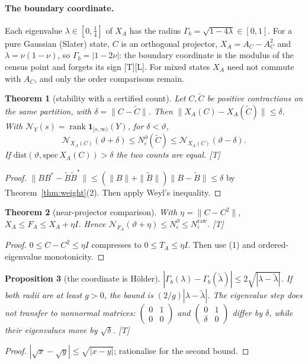 \documentclass[11pt]{article}
\newtheorem{theorem}{Theorem}[section]
\newtheorem{proposition}[theorem]{Proposition}
\theoremstyle{definition}
\newcommand{\grade}[1]{\textsf{\small[#1]}}
\newcommand{\rank}{\operatorname{rank}}
\begin{document}
\paragraph{The boundary coordinate.} Each eigenvalue $\lambda\in[0,\tfrac14]$ of $X_A$ has the radius $\Gamma_b=\sqrt{1-4\lambda}\in[0,1]$. For a pure Gaussian (Slater) state, $C$ is an orthogonal projector, $X_A=A_C-A_C^2$ and $\lambda=\nu(1-\nu)$, so $\Gamma_b=|1-2\nu|$: the boundary coordinate is the modulus of the census point and forgets its sign \grade{T}\grade{L}. For mixed states $X_A$ need not commute with $A_C$, and only the order comparisons remain.

\begin{theorem}[stability with a certified count]\label{thm:stab}
Let $C,\tilde C$ be positive contractions on the same partition, with $\delta=\|C-\tilde C\|$. Then $\|X_A(C)-X_A(\tilde C)\|\le\delta$. With $\mathcal N_Y(s)=\rank\mathbf 1_{[s,\infty)}(Y)$, for $\delta<\vartheta$,
\[
\mathcal N_{X_A(C)}(\vartheta+\delta)\le N^\partial_\varepsilon(\tilde C)\le\mathcal N_{X_A(C)}(\vartheta-\delta).
\]
If $\mathrm{dist}(\vartheta,\mathrm{spec}\,X_A(C))>\delta$ the two counts are equal. \grade{T}
\end{theorem}
\begin{proof}
$\|BB^*-\tilde B\tilde B^*\|\le(\|B\|+\|\tilde B\|)\|B-\tilde B\|\le\delta$ by Theorem~\ref{thm:weight}(2). Then apply Weyl's inequality.
\end{proof}

\begin{theorem}[near-projector comparison]\label{thm:nearproj}
With $\eta=\|C-C^2\|$, $X_A\le F_A\le X_A+\eta I$. Hence $\mathcal N_{F_A}(\vartheta+\eta)\le N^\partial_\varepsilon\le N^{\mathrm{raw}}_\varepsilon$. \grade{T}
\end{theorem}
\begin{proof}
$0\le C-C^2\le\eta I$ compresses to $0\le T_A\le\eta I$. Then use (1) and ordered-eigenvalue monotonicity.
\end{proof}

\begin{proposition}[the coordinate is Hölder]\label{prop:holder}
$|\Gamma_b(\lambda)-\Gamma_b(\tilde\lambda)|\le2\sqrt{|\lambda-\tilde\lambda|}$. If both radii are at least $g>0$, the bound is $(2/g)|\lambda-\tilde\lambda|$. The eigenvalue step does not transfer to nonnormal matrices: $\begin{pmatrix}0&1\\0&0\end{pmatrix}$ and $\begin{pmatrix}0&1\\\delta&0\end{pmatrix}$ differ by $\delta$, while their eigenvalues move by $\sqrt\delta$. \grade{T}
\end{proposition}
\begin{proof}
$|\sqrt x-\sqrt y|\le\sqrt{|x-y|}$; rationalise for the second bound.
\end{proof}
\end{document}
